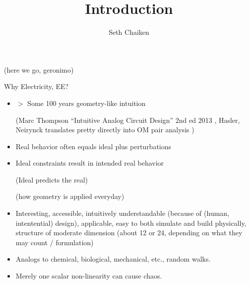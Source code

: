 \documentclass{article}
\title{Introduction}
\author{Seth Chaiken}
\begin{document}
\maketitle

(here we go, geronimo)

Why Electricity, EE?
\begin{itemize}
\item $>$ Some 100 years geometry-like intuition

(Marc Thompson ``Intuitive Analog Circuit Design'' 2nd ed 2013
\cite{intuitAna}, Hasler, Neirynck translates pretty directly into
OM pair analysis \cite{HaslerNeirynck})



\item
Real behavior often equals ideal plus perturbations

\item
Ideal constraints result in intended real behavior

(Ideal predicts the real)

(how geometry is applied everyday)

\item 
Interesting, accessible, intuitively understandable
(because of (human, intentential) design), applicable,
easy to both simulate and build physically, structure of moderate
dimension (about 12 or 24, depending on what they may count / formulation)
\item
Analogs to chemical, biological, mechanical, etc., random walks.
\item
Merely one scalar non-linearity can cause chaos.
\end{itemize}


{}

\end{document}
